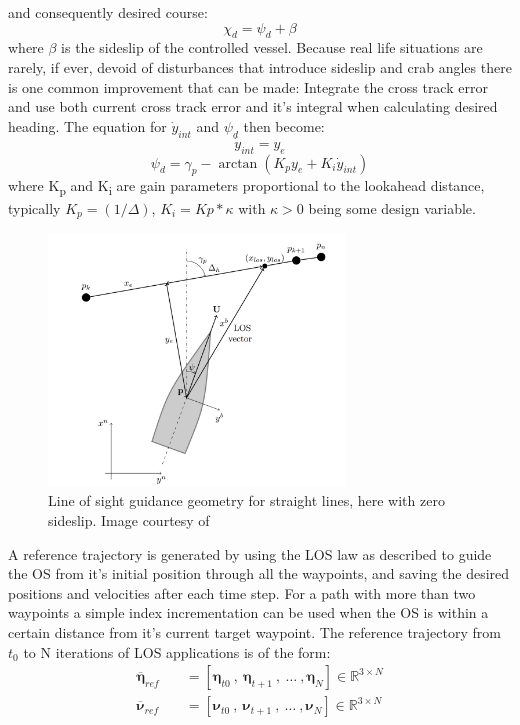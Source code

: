 and consequently desired course:
\begin{equation}
    \chi_d = \psi_d + \beta
\end{equation}
where $\beta$ is the sideslip of the controlled vessel. Because real life situations are rarely, if ever, devoid of disturbances that introduce
sideslip and crab angles there is one common improvement that can be made: Integrate the cross track error and use both current cross track error
and it's integral when calculating desired heading. The equation for $\dot{y}_{int}$ and $\psi_d$ then become:
\begin{equation}
    \dot{y}_{int} = y_e
\end{equation}
\begin{equation}
    \psi_d = \gamma_p - \arctan(K_{p}y_e + K_{i}\dot{y}_{int})
\end{equation}
where K\textsubscript{p} and K\textsubscript{i} are gain parameters proportional to the lookahead distance, typically $K_p = (1/\varDelta)$, $K_i = Kp*\kappa$
with $\kappa > 0$ being some design variable.

\begin{figure}
    \centering
    \includegraphics[width = 0.7\textwidth]{Images/LOS_decomp.png}
    \caption{Line of sight guidance geometry for straight lines, here with zero sideslip. Image courtesy of \cite{lekkas2013line}} %
    \label{FIG: LOS_decomp}
\end{figure}

A reference trajectory is generated by using the LOS law as described to guide the \gls{OS} from it's initial position through all the waypoints, and
saving the desired positions and velocities after each time step. For a path with more than two waypoints a simple index incrementation can be used when the
\gls{OS} is within a certain distance from it's current target waypoint. The reference trajectory from $t_0$ to N iterations of \gls{LOS} applications is of the form:
\begin{subequations}
    \begin{align}
        \overline{\bm{\eta}}_{ref} \quad & = [\bm{\eta}_{t0} \ , \ \bm{\eta}_{t+1} \ , \ \dots \ , \bm{\eta}_N] \in \mathbb{R}^{3 \times N} \\ 
        \overline{\bm{\nu}}_{ref} \quad & = [\bm{\nu}_{t0} \ , \ \bm{\nu}_{t+1} \ , \ \dots \ , \bm{\nu}_N] \in \mathbb{R}^{3 \times N}
    \end{align}
\end{subequations}

